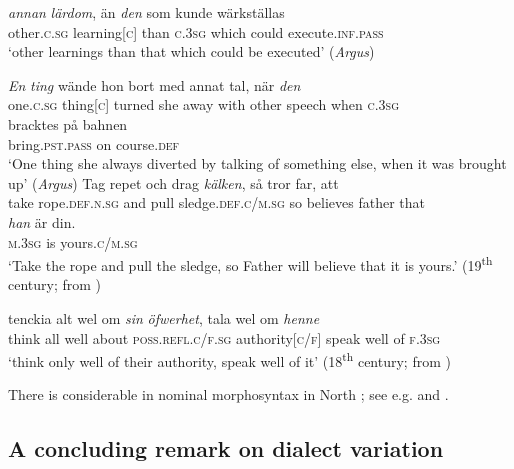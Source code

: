 \documentclass[output=paper]{langscibook}
\begin{document}
\ea\label{ex:intro:37}
\ea\label{ex:intro:37a}
\gll  \textit{annan} \textit{lärdom},     än \textit{den} som   kunde   wärkställas \\
  other.\textsc{c.sg}  learning[\textsc{c}] than   \textsc{c.3sg}   which   could   execute\textsc{.inf.pass}\\
    \glt `other learnings than that which could be executed’ (\textit{Argus})

\ex\label{ex:intro:37b}
\gll \textit{En} \textit{ting} wände   hon   bort  med annat   tal,     när \textit{den}\\
 one.\textsc{c.sg}   thing[\textsc{c}] turned   she   away   with other   speech   when   \textsc{c.3sg}\\

 \gll bracktes       på   bahnen\\
    bring.\textsc{pst.pass}   on   course.\textsc{def}\\

\glt ‘One thing she always diverted by talking of something else, when it was brought up’ (\textit{Argus})
\z
\ex \label{ex:intro:38}
\ea\label{ex:intro:38a}
\gll  Tag   repet         och drag \textit{kälken},             så tror       far,      att \\
take   rope\textsc{.def.n.sg}  and pull    sledge.\textsc{def.c/m.sg}   so believes father   that \\

\gll \textit{han}     är din.\\
    \textsc{m.3sg}  is  yours\textsc{.c/m.sg}  \\
    \glt `Take the rope and pull the sledge, so Father will believe that it is yours.’ (19\textsuperscript{th} century; from )

\ex\label{ex:intro:38b}
\gll  tenckia   alt wel   om \textit{sin} \textit{öfwerhet},        tala    wel om \textit{henne}\\
think   all well  about \textsc{poss.refl.c/f.sg} authority[\textsc{c/f}]  speak well of  \textsc{f.3sg}\\
\glt ‘think only well of their authority, speak well of it’ (18\textsuperscript{th} century; from )
\z
\z

There is considerable  in nominal morphosyntax in North ; see e.g. \citet{Delsing2003} and \citet{Dahl2015}.


\subsection{A concluding remark on dialect variation}\label{sec:intro:3.5}
\end{document}
